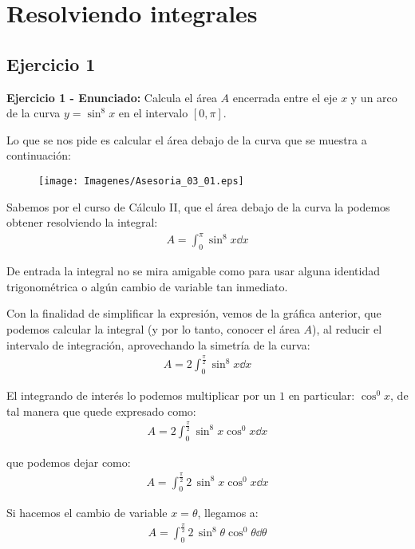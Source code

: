 \section{Resolviendo integrales}
\subsection{Ejercicio 1}

\textbf{Ejercicio 1 -  Enunciado: } Calcula el área $A$ encerrada entre el eje $x$ y un arco de la curva $y = \sin^{8} x$ en el intervalo $[0, \pi]$.
\par
Lo que se nos pide es calcular el área debajo de la curva que se muestra a continuación:
\begin{figure}[H]
    \centering
    \texttt{[image: Imagenes/Asesoria\_03\_01.eps]}
\end{figure}

Sabemos por el curso de Cálculo II, que el área debajo de la curva la podemos obtener resolviendo la integral:
\begin{align*}
A = \int_{0}^{\pi} \sin^{8} x \dd{x}
\end{align*}

De entrada la integral no se mira amigable como para usar alguna identidad trigonométrica o algún cambio de variable tan inmediato.

\par
Con la finalidad de simplificar la expresión, vemos de la gráfica anterior, que podemos calcular la integral (y por lo tanto, conocer el área $A$), al reducir el intervalo de integración, aprovechando la simetría de la curva:
\begin{align*}
A = 2 \int_{0}^{\frac{\pi}{2}} \sin^{8} x \dd{x}
\end{align*}

El integrando de interés lo podemos multiplicar por un $1$ en particular: $\cos^{0} x$, de tal manera que quede expresado como:
\begin{align*}
A = 2 \int_{0}^{\frac{\pi}{2}} \sin^{8} x \cos^{0} x \dd{x}
\end{align*}

que podemos dejar como:
\begin{align*}
A = \int_{0}^{\frac{\pi}{2}} 2 \, \sin^{8} x \cos^{0} x \dd{x}
\end{align*}

Si hacemos el cambio de variable $x = \theta$, llegamos a:
\begin{align*}
A = \int_{0}^{\frac{\pi}{2}} 2 \, \sin^{8} \theta \cos^{0} \theta \dd{\theta}
\end{align*}

